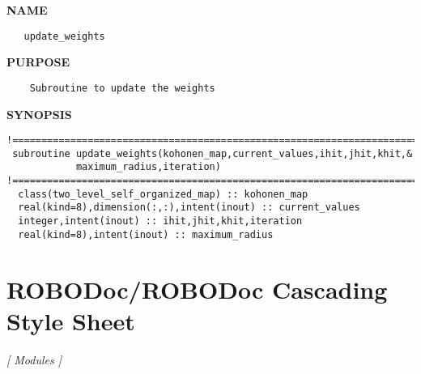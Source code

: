 \documentclass{article}
\begin{document}
\label{ch:robo81}
\label{ch:two_level_self_organized_map_utilities_update_weights}
\textbf{NAME}
\begin{verbatim}
   update_weights
\end{verbatim}
\textbf{PURPOSE}
\begin{verbatim}
    Subroutine to update the weights   
\end{verbatim}
\textbf{SYNOPSIS}
\begin{verbatim}
!========================================================================================
 subroutine update_weights(kohonen_map,current_values,ihit,jhit,khit,&
            maximum_radius,iteration) 
!========================================================================================
  class(two_level_self_organized_map) :: kohonen_map
  real(kind=8),dimension(:,:),intent(inout) :: current_values
  integer,intent(inout) :: ihit,jhit,khit,iteration
  real(kind=8),intent(inout) :: maximum_radius
\end{verbatim}
\newpage
\section{ROBODoc/ROBODoc Cascading Style Sheet}
\textsl{[ Modules ]}

\label{ch:robo9}
\label{ch:ROBODoc_ROBODoc_Cascading_Style_Sheet}
\printindex
\end{document}
